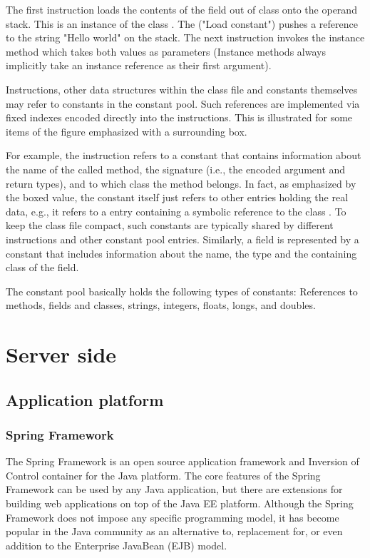 The first instruction loads the contents of the field out of class
 onto the operand stack. This is an instance of the class
. The  ("Load constant") pushes a reference
to the string "Hello world" on the stack. The next instruction invokes the
instance method  which takes both values as parameters (Instance
methods always implicitly take an instance reference as their first argument).

Instructions, other data structures within the class file and constants
themselves may refer to constants in the constant pool. Such references are
implemented via fixed indexes encoded directly into the instructions. This is
illustrated for some items of the figure emphasized with a surrounding box.

For example, the  instruction refers to a  constant that
contains information about the name of the called method, the signature (i.e.,
the encoded argument and return types), and to which class the method belongs.
In fact, as emphasized by the boxed value, the  constant itself just
refers to other entries holding the real data, e.g., it refers to a
 entry containing a symbolic reference to the class
. To keep the class file compact, such constants are
typically shared by different instructions and other constant pool entries.
Similarly, a field is represented by a  constant that includes
information about the name, the type and the containing class of the field.

The constant pool basically holds the following types of constants: References
to methods, fields and classes, strings, integers, floats, longs, and doubles.


\section{Server side}\label{sect:serverside}

\subsection{Application platform}

\subsubsection{Spring Framework~\cite{SpringWeb}}
%
The Spring Framework is an open source application framework and Inversion of
Control container for the Java platform. The core features of the Spring
Framework can be used by any Java application, but there are extensions for
building web applications on top of the Java EE platform. Although the Spring
Framework does not impose any specific programming model, it has become popular
in the Java community as an alternative to, replacement for, or even addition to
the Enterprise JavaBean (EJB) model.

